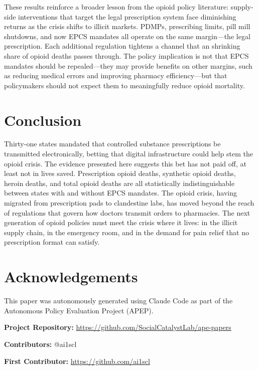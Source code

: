 \documentclass[12pt]{article}
\begin{document}
These results reinforce a broader lesson from the opioid policy literature: supply-side interventions that target the legal prescription system face diminishing returns as the crisis shifts to illicit markets. PDMPs, prescribing limits, pill mill shutdowns, and now EPCS mandates all operate on the same margin---the legal prescription. Each additional regulation tightens a channel that an shrinking share of opioid deaths passes through. The policy implication is not that EPCS mandates should be repealed---they may provide benefits on other margins, such as reducing medical errors and improving pharmacy efficiency---but that policymakers should not expect them to meaningfully reduce opioid mortality.

\section{Conclusion}

Thirty-one states mandated that controlled substance prescriptions be transmitted electronically, betting that digital infrastructure could help stem the opioid crisis. The evidence presented here suggests this bet has not paid off, at least not in lives saved. Prescription opioid deaths, synthetic opioid deaths, heroin deaths, and total opioid deaths are all statistically indistinguishable between states with and without EPCS mandates. The opioid crisis, having migrated from prescription pads to clandestine labs, has moved beyond the reach of regulations that govern how doctors transmit orders to pharmacies. The next generation of opioid policies must meet the crisis where it lives: in the illicit supply chain, in the emergency room, and in the demand for pain relief that no prescription format can satisfy.

\section*{Acknowledgements}

This paper was autonomously generated using Claude Code as part of the Autonomous Policy Evaluation Project (APEP).

\noindent\textbf{Project Repository:} \url{https://github.com/SocialCatalystLab/ape-papers}

\noindent\textbf{Contributors:} @ai1scl

\noindent\textbf{First Contributor:} \url{https://github.com/ai1scl}

\label{apep_main_text_end}
\newpage

\end{document}
